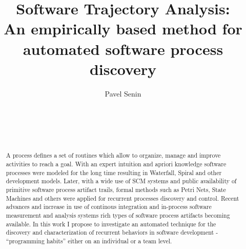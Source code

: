 \documentclass{sig-alternate}
\begin{document}
\title{Software Trajectory Analysis:\\An empirically based method for automated software process discovery}

%
\author{
%
%
\alignauthor Pavel Senin \\
\\
\\
\\
\\
}

\maketitle
\begin{abstract}
A process defines a set of routines which allow to organize, manage and improve activities to reach a goal. With an expert intuition and apriori knowledge software processes were modeled for the long time resulting in Waterfall, Spiral and other development models. Later, with a wide use of SCM systems and public availability of primitive software process artifact trails, formal methods such as Petri Nets, State Machines and others were applied for recurrent processes discovery and control. Recent advances and increase in use of continous integration and in-process software measurement and analysis systems rich types of software process artifacts becoming available. In this work I propose to investigate an automated technique for the discovery and characterization of recurrent behaviors in software development - ``programming habits'' either on an individual or a team level.
\end{abstract}
\end{document}

